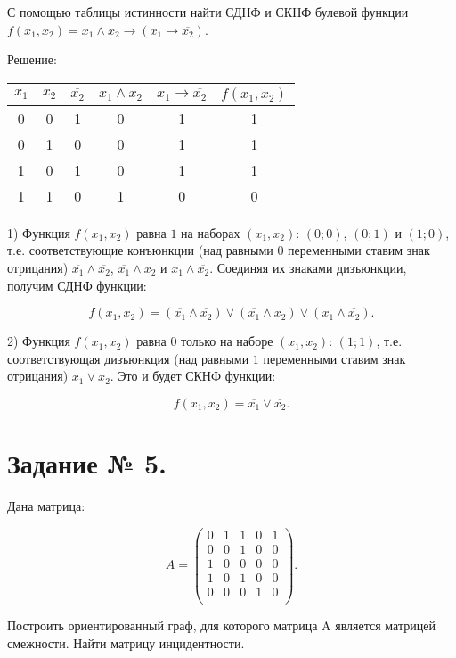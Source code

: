 \documentclass[fleqn]{article}
\begin{document}
С помощью таблицы истинности найти СДНФ и СКНФ булевой
функции $f(x_1,x_2)=x_1 \wedge x_2 \to(x_1 \to \overline{x_2})$.

\begin{center}Решение:\end{center}

\medskip
\begin{tabular}{|c|c|c|c|c|c|}
\hline
$x_1$ & $x_2$ & $\overline{x_2}$ & $x_1 \wedge x_2$ & $x_1 \to \overline{x_2}$ & $f(x_1,x_2)$ \\
\hline
0 & 0 & 1 & 0 & 1 & 1 \\
\hline
0 & 1 & 0 & 0 & 1 & 1 \\
\hline
1 & 0 & 1 & 0 & 1 & 1 \\
\hline
1 & 1 & 0 & 1 & 0 & 0 \\
\hline
\end{tabular}
\medskip

1) Функция $f(x_1, x_2)$ равна $1$ на наборах $(x_1, x_2)$: $(0;0)$, $(0;1)$ и $(1;0)$, т.е. соответствующие конъюнкции (над равными $0$ переменными ставим знак отрицания) $\overline{x_1} \wedge \overline{x_2}$, $\overline{x_1} \wedge x_2$ и $x_1 \wedge \overline{x_2}$. Соединяя их знаками дизъюнкции, получим СДНФ функции:

$$f(x_1, x_2)=(\overline{x_1}\wedge\overline{x_2})\vee(\overline{x_1} \wedge x_2)\vee(x_1\wedge\overline{x_2}).$$

2) Функция $f(x_1, x_2)$ равна $0$ только на наборе $(x_1, x_2)$: $(1;1)$, т.е. соответствующая дизъюнкция (над равными $1$ переменными ставим знак отрицания) $\overline{x_1} \vee \overline{x_2}$. Это и будет СКНФ функции:

$$f(x_1, x_2)=\overline{x_1} \vee \overline{x_2}.$$

\section*{Задание № 5.}

Дана матрица:

$$A=
\begin{pmatrix}
0 & 1 & 1 & 0 & 1 \\
0 & 0 & 1 & 0 & 0 \\
1 & 0 & 0 & 0 & 0 \\
1 & 0 & 1 & 0 & 0 \\
0 & 0 & 0 & 1 & 0 \\
\end{pmatrix}.
$$

Построить ориентированный граф, для которого матрица A является матрицей смежности. Найти матрицу инцидентности.
\end{document}
